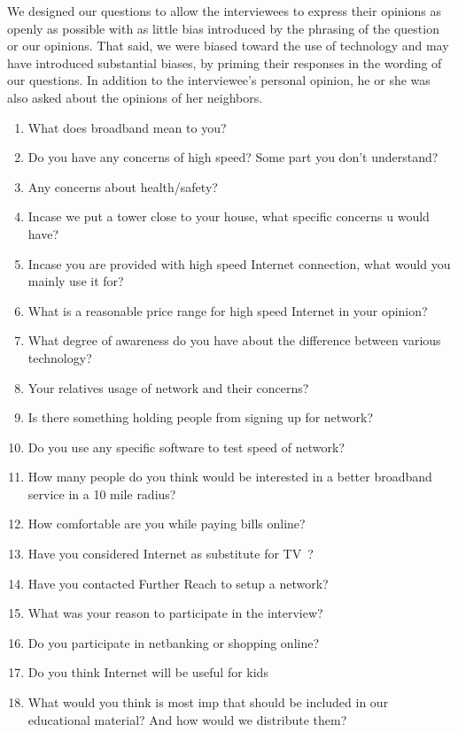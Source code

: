 We designed our questions to allow the interviewees to express their opinions as openly as possible with as little bias introduced by the
phrasing of the question or our opinions. That said, we
were biased toward the use of technology and may have introduced substantial
biases, by priming their responses in the wording of our questions. In addition
to the interviewee's personal opinion, he or she was also asked about the opinions of her
neighbors.

\begin{table}
\begin{enumerate}
    \item What does broadband mean to you?
    \item Do you have any concerns of high speed? Some part you don’t understand?
    \item Any concerns about health/safety?
    \item Incase we put a tower close to your house, what specific concerns u would have?
    \item Incase you are provided with high speed Internet connection, what would you mainly use it for?
    \item What is a reasonable price range for high speed Internet in your opinion?
    \item What degree of awareness do you have about the difference between various technology?
    \item Your relatives usage of network and their concerns?
    \item Is there something holding people from signing up for network?
    \item Do you use any specific software to test speed of network?
    \item How many people do you think would be interested in a better broadband service in a 10 mile radius?
    \item How comfortable are you while paying bills online?
    \item Have you considered Internet as substitute for TV~?
    \item Have you contacted Further Reach to setup a network?
    \item What was your reason to participate in the interview?
    \item Do you participate in netbanking or shopping online?
    \item Do you think Internet will be useful for kids
    \item What would you think is most imp that should be included in our educational material? And how would we distribute them?

\end{enumerate}
\end{table}
